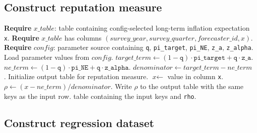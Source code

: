 \documentclass[11pt]{article}
\begin{document}
\subsection{Construct reputation measure}

\begin{algorithm}[H]
\caption{\textsc{ConstructReputationMeasure}$(\textit{x\_table}, \textit{config})$}
\begin{algorithmic}[1]
\State \textbf{Require} $\textit{x\_table}$: table containing config-selected long-term inflation expectation \texttt{x}.
\State \textbf{Require} $\textit{x\_table}$ has columns
\Statex \quad $(\textit{survey\_year}, \textit{survey\_quarter}, \textit{forecaster\_id}, \textit{x})$.
\State \textbf{Require} $\textit{config}$: parameter source containing
\Statex \quad \texttt{q}, \texttt{pi\_target}, \texttt{pi\_NE}, \texttt{z\_a}, \texttt{z\_alpha}.
\State Load parameter values from $\textit{config}$.
\State $\textit{target\_term} \gets (1-\texttt{q})\cdot\texttt{pi\_target} + \texttt{q}\cdot\texttt{z\_a}$.
\State $\textit{ne\_term} \gets (1-\texttt{q})\cdot\texttt{pi\_NE} + \texttt{q}\cdot\texttt{z\_alpha}$.
\State $\textit{denominator} \gets \textit{target\_term} - \textit{ne\_term}$.
\State Initialize output table for reputation measure.
    \State $\textit{x} \gets$ value in column \texttt{x}.
    \State $\rho \gets (\textit{x} - \textit{ne\_term}) / \textit{denominator}$.
    \State Write $\rho$ to the output table with the same keys as the input row.
\EndFor
\State \Return table containing the input keys and \texttt{rho}.
\end{algorithmic}
\end{algorithm}

\subsection{Construct regression dataset}
\end{document}

